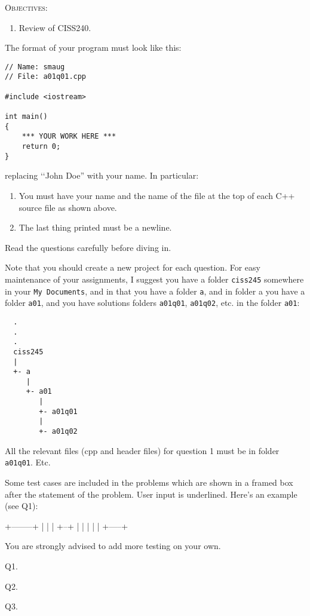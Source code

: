 


\renewcommand\TITLE{Assignment 1 (Review)}


\topmatter


\textsc{Objectives:}
\begin{enumerate}[topsep=0pt]
\item Review of CISS240.
\end{enumerate}

The format of your program must look like this:

\begin{Verbatim}[frame=single]
// Name: smaug
// File: a01q01.cpp

#include <iostream>

int main()
{
    *** YOUR WORK HERE ***
    return 0;
}
\end{Verbatim}
replacing \lq\lq John Doe'' with your name.
In particular:
\begin{enumerate}
\item You must have your name and the name of the file at the top of each 
C++ source file as shown above.
\item The last thing printed must be a newline.
\end{enumerate}

Read the questions carefully before diving in.

Note that you should create a new project for each question. 
For easy maintenance of your assignments, 
I suggest you have a folder \verb!ciss245! somewhere in your 
\verb!My Documents!, 
and in that you have a folder 
\verb!a!, 
and in folder a you have a folder 
\verb!a01!, 
and you have solutions folders 
\verb!a01q01!,
\verb!a01q02!, etc. in the folder 
\verb!a01!:


\begin{verbatim}
  .
  .
  .
  ciss245
  |
  +- a
     |
     +- a01
        |
        +- a01q01
        |
        +- a01q02
\end{verbatim}


All the relevant files (cpp and header files) for question 1 
must be in folder \verb!a01q01!. Etc.

Some test cases are included in the problems which are
shown in a framed box after the statement of the problem.
User input is underlined.
Here's an example (see Q1):
\begin{console}[commandchars=\\\{\}]
+--------+
|        |
|  +--+  |
|  |     |
|  +-----+
\end{console}
You are strongly advised to add more testing on your own.

\newpage

Q1.


\newpage
Q2.


\newpage
Q3.





